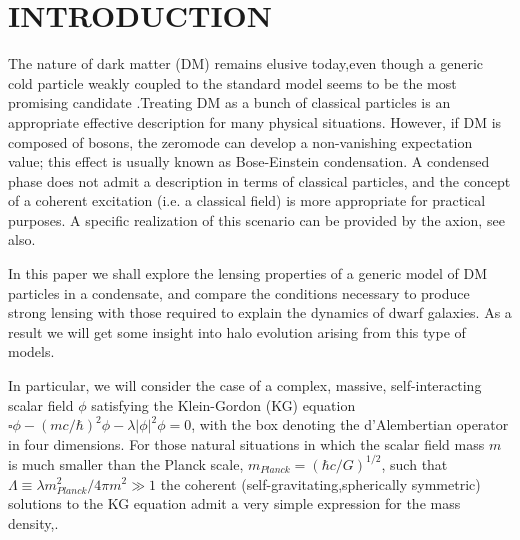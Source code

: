 \documentclass[15pt]{IEEEtran}
\begin{document}
\section{\textbf{INTRODUCTION}}
The nature of dark matter (DM) remains elusive today,even though a generic cold particle weakly coupled to the standard model seems to be the most promising candidate \cite{BERTONE2005279}.Treating DM as a bunch of classical particles is an appropriate effective description for many physical situations.  However, if DM is composed of bosons, the zeromode can develop a non-vanishing expectation value; this effect is usually known as Bose-Einstein condensation. A condensed phase does not admit a description in terms of classical particles, and the concept of a coherent excitation (i.e.  a classical field) is more appropriate for practical purposes\cite{PhysRevD.28.1243}. A specific realization of this scenario can be provided by the axion\cite{PhysRevLett.38.1440}, see also\cite{BOEHM2004219}.
\par
In  this  paper  we  shall  explore  the  lensing  properties of a generic model of DM particles in a condensate, and compare the conditions necessary to produce strong lensing with those required to explain the dynamics of dwarf galaxies.  As a result we will get some insight into halo evolution arising from this type of models.
\par
In  particular,  we  will  consider  the  case  of  a  complex,  massive,  self-interacting  scalar  field $\phi$ satisfying the Klein-Gordon (KG) equation \(\square\phi - (mc/\hbar)^2 \phi - \lambda|\phi|^2\phi = 0\), with  the  box  denoting  the  d’Alembertian operator  in  four  dimensions.   For  those  natural  situations  in  which  the  scalar  field  mass $m$ is  much  smaller than  the  Planck  scale, \(m_{Planck} = (\hbar c /G)^{1/2}\), such that \(\Lambda \equiv \lambda m^2_{Planck}/4\pi m^2 \gg 1\) the coherent (self-gravitating,spherically symmetric) solutions to the KG equation admit a very simple expression for the mass density\cite{PhysRevLett.57.2485},\cite{PhysRevD.68.023511}. \\
\end{document}
